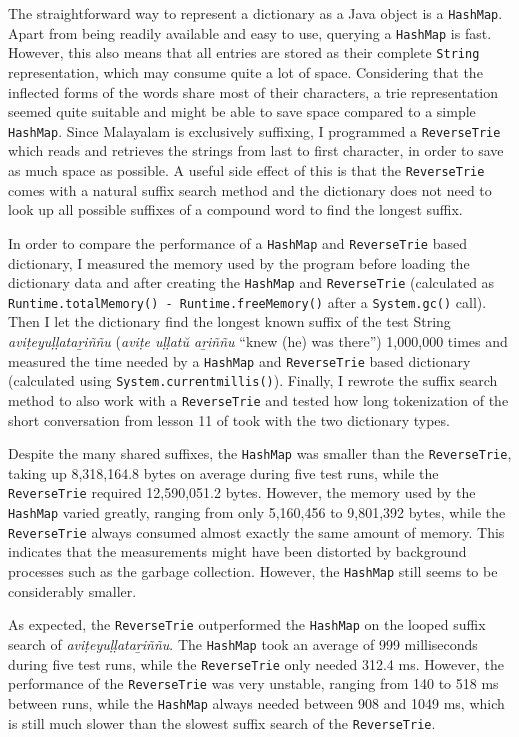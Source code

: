 \documentclass[a4paper]{article}
\newcommand{\typ}[1]{\texttt{#1}}
\begin{document}
The straightforward way to represent a dictionary as a Java object is a \typ{HashMap}. Apart from being readily available and easy to use, querying a \typ{HashMap} is fast. However, this also means that all entries are stored as their complete \typ{String} representation, which may consume quite a lot of space. Considering that the inflected forms of the words share most of their characters, a trie representation seemed quite suitable and might be able to save space compared to a simple \typ{HashMap}. Since Malayalam is exclusively suffixing, I programmed a \typ{ReverseTrie} which reads and retrieves the strings from last to first character, in order to save as much space as possible. A useful side effect of this is that the \typ{ReverseTrie} comes with a natural suffix search method and the dictionary does not need to look up all possible suffixes of a compound word to find the longest suffix.

In order to compare the performance of a \typ{HashMap} and \typ{ReverseTrie} based dictionary, I measured the memory used by the program before loading the dictionary data and after creating the \typ{HashMap} and \typ{ReverseTrie} (calculated as \typ{Runtime.totalMemory() - Runtime.freeMemory()} after a \typ{System.gc()} call). Then I let the dictionary find the longest known suffix of the test String \textit{aviṭeyuḷḷataṟiññu} (\textit{aviṭe uḷḷatŭ aṟiññu} ``knew (he) was there'') 1,000,000 times and measured the time needed by a \typ{HashMap} and \typ{ReverseTrie} based dictionary (calculated using \typ{System.currentmillis()}). Finally, I rewrote the suffix search method to also work with a \typ{ReverseTrie} and tested how long tokenization of the short conversation from lesson 11 of \textcite[p.164f, see appendix]{moag} took with the two dictionary types.

Despite the many shared suffixes, the \typ{HashMap} was smaller than the \typ{ReverseTrie}, taking up 8,318,164.8 bytes on average during five test runs, while the \typ{ReverseTrie} required 12,590,051.2 bytes. However, the memory used by the \typ{HashMap} varied greatly, ranging from only 5,160,456 to 9,801,392 bytes, while the \typ{ReverseTrie} always consumed almost exactly the same amount of memory. This indicates that the measurements might have been distorted by background processes such as the garbage collection. However, the \typ{HashMap} still seems to be considerably smaller.

As expected, the \typ{ReverseTrie} outperformed the \typ{HashMap} on the looped suffix search of \textit{aviṭeyuḷḷataṟiññu}. The \typ{HashMap} took an average of 999 milliseconds during five test runs, while the \typ{ReverseTrie} only needed 312.4 ms. However, the performance of the \typ{ReverseTrie} was very unstable, ranging from 140 to 518 ms between runs, while the \typ{HashMap} always needed between 908 and 1049 ms, which is still much slower than the slowest suffix search of the \typ{ReverseTrie}.
\end{document}
